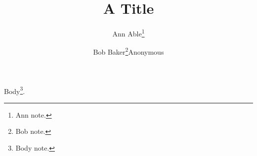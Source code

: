 \documentclass{llncs}
\title{A Title}
\author{\ifx\Anonymous\undefined Ann Able\thanks{Ann note.} \and Bob Baker\thanks{Bob note.}\else Anonymous\fi}
\institute{Lab A}
\begin{document}
\maketitle
Body\footnote{Body note.}.
\end{document}
